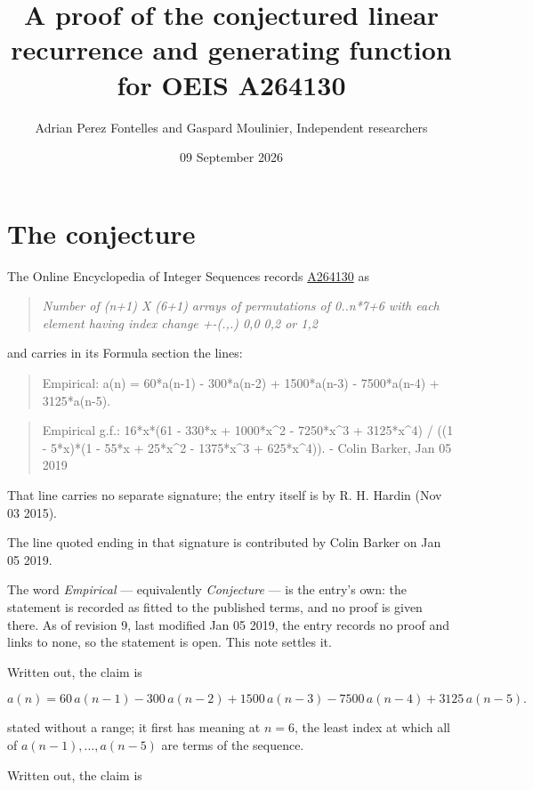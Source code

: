 \documentclass[11pt]{article}
\title{A proof of the conjectured linear recurrence and generating function for OEIS A264130}
\author{Adrian Perez Fontelles and Gaspard Moulinier, Independent researchers}
\date{09 September 2026}
\theoremstyle{definition}
\begin{document}
\maketitle
\section{The conjecture}

The Online Encyclopedia of Integer Sequences records \href{https://oeis.org/A264130}{A264130} as

\begin{quote}\itshape Number of (n+1) X (6+1) arrays of permutations of 0..n*7+6 with each element having index change +-(.,.) 0,0 0,2 or 1,2\end{quote}

and carries in its Formula section the lines:

\begin{quote}\ttfamily Empirical: a(n) = 60*a(n-1) - 300*a(n-2) + 1500*a(n-3) - 7500*a(n-4) + 3125*a(n-5).\end{quote}

\begin{quote}\ttfamily Empirical g.f.: 16*x*(61 - 330*x + 1000*x\textasciicircum{}2 - 7250*x\textasciicircum{}3 + 3125*x\textasciicircum{}4) / ((1 - 5*x)*(1 - 55*x + 25*x\textasciicircum{}2 - 1375*x\textasciicircum{}3 + 625*x\textasciicircum{}4)). - Colin Barker, Jan 05 2019\end{quote}

That line carries no separate signature; the entry itself is by R. H. Hardin (Nov 03 2015).

The line quoted ending in that signature is contributed by Colin Barker on Jan 05 2019.

The word {\itshape Empirical} --- equivalently {\itshape Conjecture} --- is the entry's own: the statement is recorded as fitted to the published terms, and no proof is given there. As of revision 9, last modified Jan 05 2019, the entry records no proof and links to none, so the statement is open. This note settles it.

Written out, the claim is

\[a(n) = 60\,a(n-1) - 300\,a(n-2) + 1500\,a(n-3) - 7500\,a(n-4) + 3125\,a(n-5).\]

stated without a range; it first has meaning at $n = 6$, the least index at which all of $a(n-1),\dots,a(n-5)$ are terms of the sequence.

Written out, the claim is
\end{document}
